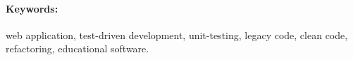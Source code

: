 \documentclass[12pt, oneside]{book}  %
\begin{document}
\paragraph*{Keywords:} web application, test-driven development, unit-testing, legacy code, clean code, refactoring, educational software.


%
%



\newpage 

\tableofcontents



\newpage 

\listoffigures


\mainmatter


 













\newpage	

\backmatter

\thispagestyle{empty}
\nocite{*}
\clearpage




 
\end{document}

